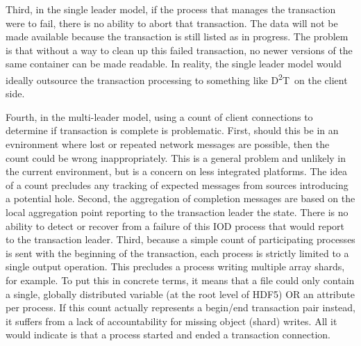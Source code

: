 \documentclass[conference]{sig-alt-gov2}
\newcommand{\DDT}{D\textsuperscript{2}T~}
\begin{document}
Third, in the single leader model, if the process that manages the transaction
were to fail, there is no ability to abort that transaction. The data will not
be made available because the transaction is still listed as in progress. The
problem is that without a way to clean up this failed transaction, no newer
versions of the same container can be made readable. In reality, the single
leader model would ideally outsource the transaction processing to something
like \DDT on the client side.

Fourth, in the multi-leader model, using a count of client connections to
determine if transaction is complete is problematic.  First, should this be in
an evnironment where lost or repeated network messages are possible, then the
count could be wrong inappropriately. This is a general problem and unlikely
in the current environment, but is a concern on less integrated platforms.
The idea of a count precludes any tracking of expected messages from sources
introducing a potential hole. Second, the aggregation of completion messages
are based on the local aggregation point reporting to the transaction
leader the state.  There is no ability to detect or recover from a failure of
this IOD process that would report to the transaction leader. Third, because a
simple count of participating processes is sent with the beginning of the
transaction, each process is strictly limited to a single output operation.
This precludes a process writing multiple array shards, for example. To put
this in concrete terms, it means that a file could only contain a single,
globally distributed variable (at the root level of HDF5) OR an attribute per
process. If this count actually represents a begin/end transaction pair
instead, it suffers from a lack of accountability for missing object (shard)
writes. All it would indicate is that a process started and ended a transaction
connection.
\end{document}
